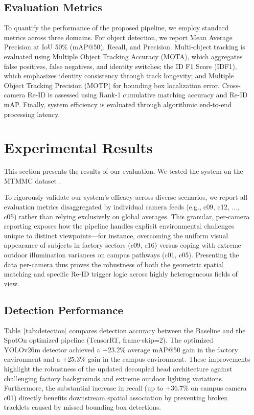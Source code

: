 \documentclass[conference]{IEEEtran}
\begin{document}
\subsection{Evaluation Metrics}
\label{subsec:metrics}

To quantify the performance of the proposed pipeline, we employ standard metrics across three domains. For object detection, we report Mean Average Precision at IoU 50\% (mAP@50), Recall, and Precision. Multi-object tracking is evaluated using Multiple Object Tracking Accuracy (MOTA), which aggregates false positives, false negatives, and identity switches; the ID F1 Score (IDF1), which emphasizes identity consistency through track longevity; and Multiple Object Tracking Precision (MOTP) for bounding box localization error. Cross-camera Re-ID is assessed using Rank-1 cumulative matching accuracy and Re-ID mAP. Finally, system efficiency is evaluated through algorithmic end-to-end processing latency.


\section{Experimental Results}
\label{sec:results}

This section presents the results of our evaluation. We tested the system on the MTMMC dataset \cite{mtmmc}. 

To rigorously validate our system's efficacy across diverse scenarios, we report all evaluation metrics disaggregated by individual camera feeds (e.g., c09, c12, ..., c05) rather than relying exclusively on global averages. This granular, per-camera reporting exposes how the pipeline handles explicit environmental challenges unique to distinct viewpoints---for instance, overcoming the uniform visual appearance of subjects in factory sectors (c09, c16) versus coping with extreme outdoor illumination variances on campus pathways (c01, c05). Presenting the data per-camera thus proves the robustness of both the geometric spatial matching and specific Re-ID trigger logic across highly heterogeneous fields of view.

\subsection{Detection Performance}
\label{subsec:detection-results}

Table~\ref{tab:detection} compares detection accuracy between the Baseline and the SpotOn optimized pipeline (TensorRT, frame-skip=2). The optimized YOLOv26m detector achieved a +23.2\% average mAP@50 gain in the factory environment and a +25.3\% gain in the campus environment. These improvements highlight the robustness of the updated decoupled head architecture against challenging factory backgrounds and extreme outdoor lighting variations. Furthermore, the substantial increase in recall (up to +36.7\% on campus camera c01) directly benefits downstream spatial association by preventing broken tracklets caused by missed bounding box detections.
\end{document}
